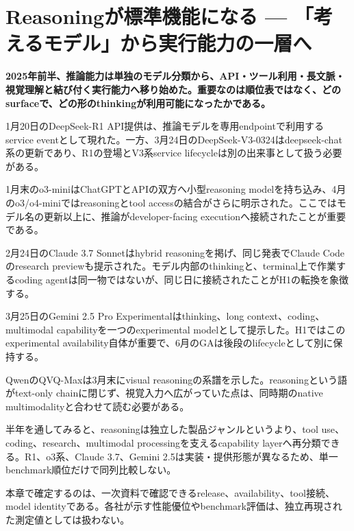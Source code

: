 \section{Reasoningが標準機能になる — 「考えるモデル」から実行能力の一層へ}
\label{pkg:reasoning}
\noindent\textbf{2025年前半、推論能力は単独のモデル分類から、API・ツール利用・長文脈・視覚理解と結び付く実行能力へ移り始めた。重要なのは順位表ではなく、どのsurfaceで、どの形のthinkingが利用可能になったかである。}\autocite{src-421ee9af3f80,src-650b567698aa,src-8f8555b73e1b}

1月20日のDeepSeek-R1 API提供は、推論モデルを専用endpointで利用するservice eventとして現れた。一方、3月24日のDeepSeek-V3-0324はdeepseek-chat系の更新であり、R1の登場とV3系service lifecycleは別の出来事として扱う必要がある。\autocite{src-8f8555b73e1b}


1月末のo3-miniはChatGPTとAPIの双方へ小型reasoning modelを持ち込み、4月のo3/o4-miniではreasoningとtool accessの結合がさらに明示された。ここではモデル名の更新以上に、推論がdeveloper-facing executionへ接続されたことが重要である。\autocite{src-650b567698aa,src-bf92f3d905c3}


2月24日のClaude 3.7 Sonnetはhybrid reasoningを掲げ、同じ発表でClaude Codeのresearch previewも提示された。モデル内部のthinkingと、terminal上で作業するcoding agentは同一物ではないが、同じ日に接続されたことがH1の転換を象徴する。\autocite{src-a6c92f94a0af}


3月25日のGemini 2.5 Pro Experimentalはthinking、long context、coding、multimodal capabilityを一つのexperimental modelとして提示した。H1ではこのexperimental availability自体が重要で、6月のGAは後段のlifecycleとして別に保持する。\autocite{src-421ee9af3f80}


QwenのQVQ-Maxは3月末にvisual reasoningの系譜を示した。reasoningという語がtext-only chainに閉じず、視覚入力へ広がっていた点は、同時期のnative multimodalityと合わせて読む必要がある。\autocite{src-8cb736b33646}


半年を通してみると、reasoningは独立した製品ジャンルというより、tool use、coding、research、multimodal processingを支えるcapability layerへ再分類できる。R1、o3系、Claude 3.7、Gemini 2.5は実装・提供形態が異なるため、単一benchmark順位だけで同列比較しない。\autocite{src-421ee9af3f80,src-8f8555b73e1b,src-a6c92f94a0af,src-bf92f3d905c3}


\begin{claimboundary}
本章で確定するのは、一次資料で確認できるrelease、availability、tool接続、model identityである。各社が示す性能優位やbenchmark評価は、独立再現された測定値としては扱わない。
\end{claimboundary}
